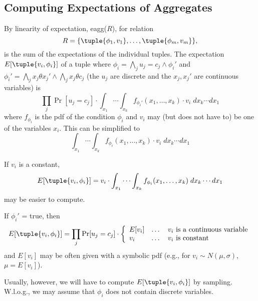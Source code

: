 \subsection{Computing Expectations of Aggregates}


By linearity of expectation, eagg($R$), for relation
\[
R = \{ \tuple{\phi_1, v_1}, \dots, \tuple{\phi_m, v_m} \},
\]
is the sum of the expectations of the individual tuples.
The expectation $E[\tuple{v_i, \phi_i}]$ of a tuple
where
$\phi_i = \bigwedge_j u_j=c_j \land \phi_i'$
and
$\phi_i' =\bigwedge_j x_j \theta x_j' \land
          \bigwedge_j x_j \theta c_j$
(the $u_j$ are discrete and the $x_j, x_j'$ are continuous variables) is
\[
\prod_j \Pr[u_j=c_j] \cdot
\int_{x_1} \cdots \int_{x_k} f_{\phi_i'}(x_1, \dots, x_k) \cdot v_i
\; dx_k \cdots dx_1
\]
where $f_{\phi_i}$ is the pdf of the condition $\phi_i$ and
$v_i$ may (but does not have to) be one of the variables $x_i$.
This can be simplified to
\[
\int_{x_1} \cdots \int_{x_k} f_{\phi_i}(x_1, \dots, x_k) \cdot v_i
\; dx_k \cdots dx_1
\]


If $v_i$ is a constant,
\[
E[\tuple{v_i, \phi_i}] =
   v_i \cdot \int_{x_1} \cdots \int_{x_k} f_{\phi_i}(x_1, \dots, x_k)
\; dx_k \cdots dx_1
\]
may be easier to compute.


If $\phi_i'$ = true, then
\[
E[\tuple{v_i, \phi_i}] =
\prod_j \Pr[u_j=c_j] \cdot
\left\{
\begin{array}{lll}
E[v_i] &\dots& \mbox{$v_i$ is a continuous variable} \\
v_i    &\dots& \mbox{$v_i$ is constant}
\end{array}
\right.
\]
and $E[v_i]$ may be often given with a symbolic pdf
(e.g., for $v_i \sim N(\mu, \sigma)$, $\mu = E[v_i]$).


Usually, however, we will have to compute
$E[\tuple{v_i, \phi_i}]$ by sampling. W.l.o.g., we may assume that
$\phi_i$ does not contain discrete variables.



